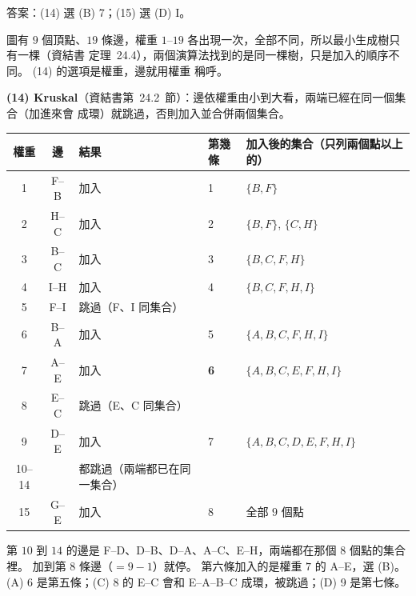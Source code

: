 \begin{pastsoln}
答案：(14) 選 (B) 7；(15) 選 (D) I。

圖有 $9$ 個頂點、$19$ 條邊，權重 $1$--$19$ 各出現一次，全部不同，所以最小生成樹只有一棵（資結書
定理~24.4），兩個演算法找到的是同一棵樹，只是加入的順序不同。 (14) 的選項是權重，邊就用權重
稱呼。

\textbf{(14) Kruskal}（資結書第~24.2~節）：邊依權重由小到大看，兩端已經在同一個集合（加進來會
成環）就跳過，否則加入並合併兩個集合。
\begin{center}
\small
\begin{tabular}{cclll}
\toprule
權重 & 邊 & 結果 & 第幾條 & 加入後的集合（只列兩個點以上的） \\
\midrule
1 & F--B & 加入 & 1 & $\{B, F\}$ \\
2 & H--C & 加入 & 2 & $\{B, F\}$, $\{C, H\}$ \\
3 & B--C & 加入 & 3 & $\{B, C, F, H\}$ \\
4 & I--H & 加入 & 4 & $\{B, C, F, H, I\}$ \\
5 & F--I & 跳過（F、I 同集合） & & \\
6 & B--A & 加入 & 5 & $\{A, B, C, F, H, I\}$ \\
7 & A--E & 加入 & \textbf{6} & $\{A, B, C, E, F, H, I\}$ \\
8 & E--C & 跳過（E、C 同集合） & & \\
9 & D--E & 加入 & 7 & $\{A, B, C, D, E, F, H, I\}$ \\
10--14 & & 都跳過（兩端都已在同一集合） & & \\
15 & G--E & 加入 & 8 & 全部 $9$ 個點 \\
\bottomrule
\end{tabular}
\end{center}
第 $10$ 到 $14$ 的邊是 F--D、D--B、D--A、A--C、E--H，兩端都在那個 $8$ 個點的集合裡。 加到第 $8$
條邊（$= 9 - 1$）就停。 第六條加入的是權重 $7$ 的 A--E，選 (B)。 (A) 6 是第五條；(C) 8 的 E--C
會和 E--A--B--C 成環，被跳過；(D) 9 是第七條。


\end{pastsoln}
